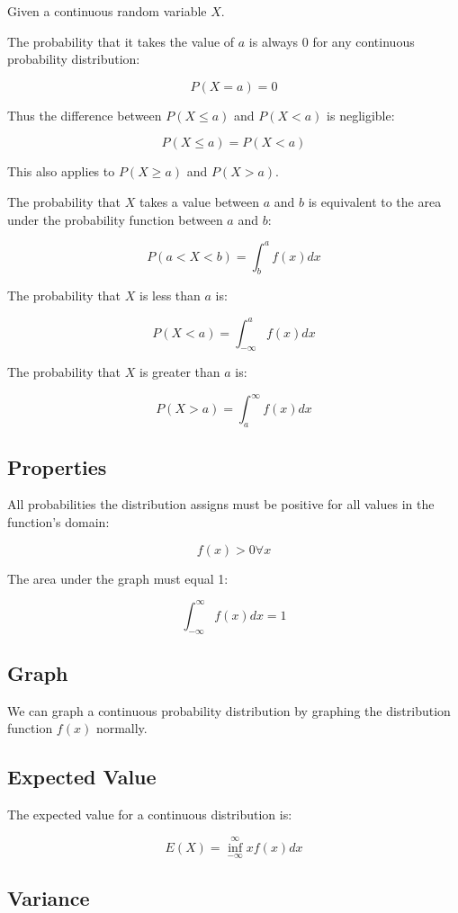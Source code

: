 \documentclass[a4paper,11pt]{article}
\begin{document}
Given a continuous random variable $X$.

The probability that it takes the value of $a$ is always 0 for any continuous
probability distribution:

$$
P(X = a) = 0
$$

Thus the difference between $P(X \leq a)$ and $P(X < a)$ is negligible:

$$
P(X \leq a) = P(X < a)
$$

This also applies to $P(X \geq a)$ and $P(X > a)$.

The probability that $X$ takes a value between $a$ and $b$ is equivalent to the
area under the probability function between $a$ and $b$:

$$
P(a < X < b) = \int_b^a f(x) dx
$$

The probability that $X$ is less than $a$ is:

$$
P(X < a) = \int_{-\infty}^a f(x) dx
$$

The probability that $X$ is greater than $a$ is:

$$
P(X > a) = \int_a^{\infty} f(x) dx
$$


\subsection{Properties}

All probabilities the distribution assigns must be positive for all values in
the function's domain:

$$
f(x) > 0 \forall x
$$

The area under the graph must equal 1:

$$
\int_{-\infty}^{\infty} f(x) dx = 1
$$


\subsection{Graph}

We can graph a continuous probability distribution by graphing the distribution
function $f(x)$ normally.


\subsection{Expected Value}

The expected value for a continuous distribution is:

$$
E(X) = \inf_{-\infty}^{\infty} x f(x) dx
$$


\subsection{Variance}
\end{document}

